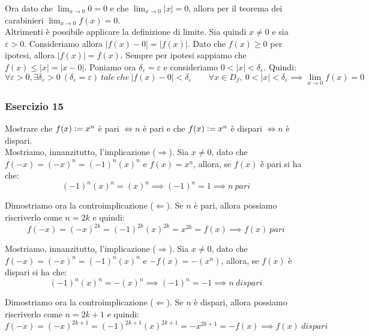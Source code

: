 \documentclass{article}
\begin{document}
\noindent Ora dato che $\lim_{x \to 0} 0 = 0$ e che $\lim_{x \to 0} |x| = 0$, allora per il teorema dei carabinieri $\lim_{x \to 0} f(x) = 0$.\\
Altrimenti è possibile applicare la definizione di limite. Sia quindi $x \neq 0$ e sia $\varepsilon > 0$. Consideriamo allora $|f(x) - 0| = |f(x)|$. Dato che $f(x) \geq 0$ per ipotesi, allora $|f(x)| = f(x)$. Sempre per ipotesi sappiamo che $f(x) \leq |x| = |x - 0|$. Poniamo ora $\delta_\varepsilon = \varepsilon$ e consideriamo $0 < |x| < \delta_\varepsilon$. Quindi:
\begin{equation*}
    \forall \varepsilon > 0, \exists \delta_\varepsilon > 0 \ (\delta_\varepsilon = \varepsilon) \ tale \ che \ |f(x) - 0| < \delta_\varepsilon \qquad \forall x \in D_f, \ 0 < |x| < \delta_\varepsilon \implies \lim_{x \to 0} f(x) = 0
\end{equation*}

\subsubsection{Esercizio 15}
Mostrare che $f(x) \vcentcolon = x^n$ è pari $\iff n$ è pari e che $f(x) \vcentcolon = x^n$ è dispari $\iff n$ è dispari. \\

\noindent Mostriamo, innanzitutto, l'implicazione ($\Rightarrow$). Sia $x \neq 0$, dato che $f(-x) = (-x)^n = (-1)^n (x)^n$ e $f(x) = x^n$, allora, se $f(x)$ è pari si ha che:
\begin{equation*}
    (-1)^n (x)^n = (x)^n \implies (-1)^n = 1 \implies n \ pari
\end{equation*}

\noindent Dimostriamo ora la controimplicazione ($\Leftarrow$). Se $n$ è pari, allora possiamo riscriverlo come $n = 2k$ e quindi:
\begin{equation*}
    f(-x) = (-x)^{2k} = (-1)^{2k} (x)^{2k} = x^{2k} = f(x) \implies f(x) \ pari
\end{equation*}

\noindent Mostriamo, innanzitutto, l'implicazione ($\Rightarrow$). Sia $x \neq 0$, dato che $f(-x) = (-x)^n = (-1)^n (x)^n$ e $-f(x) = -(x^n)$, allora, se $f(x)$ è dispari si ha che:
\begin{equation*}
    (-1)^n (x)^n = -(x)^n \implies (-1)^n = -1 \implies n \ dispari
\end{equation*}

\noindent Dimostriamo ora la controimplicazione ($\Leftarrow$). Se $n$ è dispari, allora possiamo riscriverlo come $n = 2k + 1$ e quindi:
\begin{equation*}
    f(-x) = (-x)^{2k + 1} = (-1)^{2k + 1} (x)^{2k + 1} = -x^{2k + 1} = -f(x) \implies f(x) \ dispari
\end{equation*}
\end{document}
